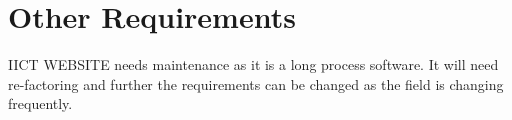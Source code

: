 \documentclass[../main.tex]{subfiles}
\begin{document}
\chapter{Other Requirements}
IICT WEBSITE needs maintenance as it is a long process software. It will need re-factoring and further the requirements can be changed as the field is changing frequently. 
\end{document}
